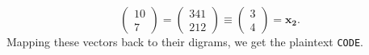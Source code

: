 \documentclass[12pt]{article}
\newenvironment{answer}
    {\begin{adjustwidth}{0pt}{0pt}}
    {\end{adjustwidth}}
\theoremstyle{remark}  %
\begin{document}
\begin{answer}
$$            \begin{pmatrix}
                10 \\
                7
            \end{pmatrix} = 
            \begin{pmatrix}
                341 \\
                212
            \end{pmatrix} \equiv
            \begin{pmatrix}
                3 \\
                4
            \end{pmatrix} = \mathbf{x_2}
            .$$ Mapping these vectors back to their digrams, we get the plaintext \texttt{CODE}.
    \end{answer}
\end{document}
